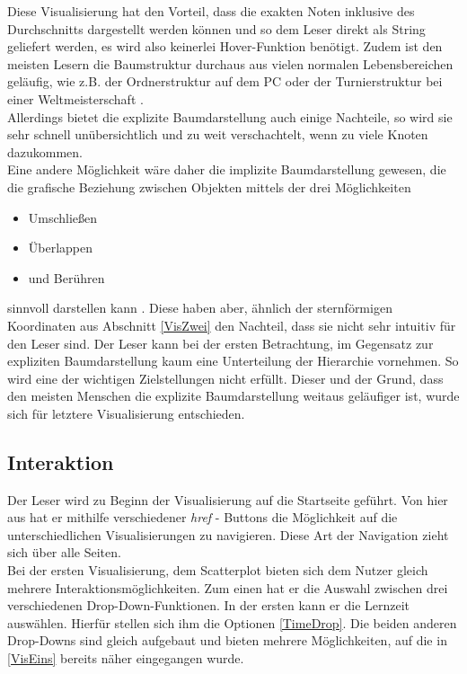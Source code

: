 \documentclass[usegeometry=true]{scrartcl}
\begin{document}
Diese Visualisierung hat den Vorteil, dass die exakten Noten inklusive des Durchschnitts dargestellt werden können und so dem Leser direkt als String geliefert werden, es wird also keinerlei Hover-Funktion benötigt. Zudem ist den meisten Lesern die Baumstruktur durchaus aus vielen normalen Lebensbereichen geläufig, wie z.B. der Ordnerstruktur auf dem PC oder der Turnierstruktur bei einer Weltmeisterschaft \cite{Hinneburg2022}.\\
Allerdings bietet die explizite Baumdarstellung auch einige Nachteile, so wird sie sehr schnell unübersichtlich und zu weit verschachtelt, wenn zu viele Knoten dazukommen.\\
Eine andere Möglichkeit wäre daher die implizite Baumdarstellung gewesen, die die grafische Beziehung zwischen Objekten mittels der drei Möglichkeiten

\begin{itemize}
\item Umschließen
\item Überlappen
\item und Berühren
\end{itemize}

\noindent sinnvoll darstellen kann \cite{Hinneburg2022}. Diese haben aber, ähnlich der sternförmigen Koordinaten aus Abschnitt \ref{VisZwei} den Nachteil, dass sie nicht sehr intuitiv für den Leser sind. Der Leser kann bei der ersten Betrachtung, im Gegensatz zur expliziten Baumdarstellung kaum eine Unterteilung der Hierarchie vornehmen. So wird eine der wichtigen Zielstellungen nicht erfüllt. Dieser und der Grund, dass den meisten Menschen die explizite Baumdarstellung weitaus geläufiger ist, wurde sich für letztere Visualisierung entschieden. 






\subsection{Interaktion}
\label{Interaktion}
Der Leser wird zu Beginn der Visualisierung auf die Startseite geführt. Von hier aus hat er mithilfe verschiedener \textit{href} - Buttons die Möglichkeit auf die unterschiedlichen Visualisierungen zu navigieren. Diese Art der Navigation zieht sich über alle Seiten.\\

\noindent Bei der ersten Visualisierung, dem Scatterplot bieten sich dem Nutzer gleich mehrere Interaktionsmöglichkeiten. Zum einen hat er die Auswahl zwischen drei verschiedenen Drop-Down-Funktionen. In der ersten kann er die Lernzeit auswählen. Hierfür stellen sich ihm die Optionen \ref{TimeDrop}. Die beiden anderen Drop-Downs sind gleich aufgebaut und bieten mehrere Möglichkeiten, auf die in \ref{VisEins} bereits näher eingegangen wurde.
\end{document}
